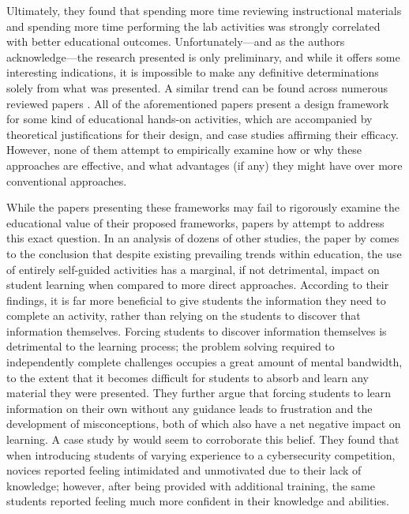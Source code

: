     Ultimately, they found that spending more time reviewing instructional materials and spending more time performing the lab activities was strongly correlated with better educational outcomes. Unfortunately---and as the authors acknowledge---the research presented is only preliminary, and while it offers some interesting indications, it is impossible to make any definitive determinations solely from what was presented. A similar trend can be found across numerous reviewed papers \cite{Y-Deng,W-Du,N-Eliot}. All of the aforementioned papers present a design framework for some kind of educational hands-on activities, which are accompanied by theoretical justifications for their design, and case studies affirming their efficacy. However, none of them attempt to empirically examine how or why these approaches are effective, and what advantages (if any) they might have over more conventional approaches. 

    While the papers presenting these frameworks may fail to rigorously examine the educational value of their proposed frameworks, papers by \textcite{J-Sweller,R-Weiss} attempt to address this exact question. In an analysis of dozens of other studies, the paper by \citeauthor{J-Sweller} comes to the conclusion that despite existing prevailing trends within education, the use of entirely self-guided activities has a marginal, if not detrimental, impact on student learning when compared to more direct approaches. According to their findings, it is far more beneficial to give students the information they need to complete an activity, rather than relying on the students to discover that information themselves. Forcing students to discover information themselves is detrimental to the learning process; the problem solving required to independently complete challenges occupies a great amount of mental bandwidth, to the extent that it becomes difficult for students to absorb and learn any material they were  presented. They further argue that forcing students to learn information on their own without any guidance leads to frustration and the development of misconceptions, both of which also have a net negative impact on learning. A case study by \textcite{L-Thomas} would seem to corroborate this belief. They found that when introducing students of varying experience to a cybersecurity competition, novices reported feeling intimidated and unmotivated due to their lack of knowledge; however, after being provided with additional training, the same students reported feeling much more confident in their knowledge and abilities. 

